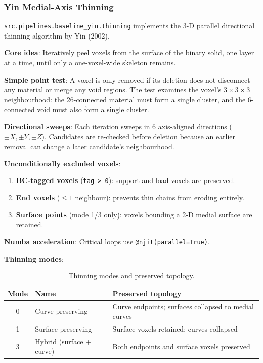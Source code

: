 \documentclass[a4paper, 11pt, openany]{report}
\begin{document}
\subsubsection{Yin Medial-Axis Thinning}

\texttt{src.pipelines.baseline\_yin.thinning} implements the 3-D parallel
directional thinning algorithm by Yin (2002).

\textbf{Core idea}: Iteratively peel voxels from the surface of the binary
solid, one layer at a time, until only a one-voxel-wide skeleton remains.

\textbf{Simple point test}: A voxel is only removed if its deletion does not
disconnect any material or merge any void regions.  The test examines the
voxel's $3 \times 3 \times 3$ neighbourhood: the 26-connected material must
form a single cluster, and the 6-connected void must also form a single cluster.

\textbf{Directional sweeps}: Each iteration sweeps in 6 axis-aligned directions
($\pm X, \pm Y, \pm Z$).  Candidates are re-checked before deletion because
an earlier removal can change a later candidate's neighbourhood.

\textbf{Unconditionally excluded voxels}:
\begin{enumerate}[nosep]
    \item \textbf{BC-tagged voxels} (\texttt{tag > 0}): support and load voxels
          are preserved.
    \item \textbf{End voxels} ($\le 1$ neighbour): prevents thin chains from
          eroding entirely.
    \item \textbf{Surface points} (mode 1/3 only): voxels bounding a 2-D medial
          surface are retained.
\end{enumerate}

\textbf{Numba acceleration}: Critical loops use \texttt{@njit(parallel=True)}.

\textbf{Thinning modes}:

\begin{table}[htbp]
\caption{Thinning modes and preserved topology.}
\label{tab:thinning-modes}
\centering
\begin{tabularx}{\textwidth}{clX}
\toprule
Mode & Name & Preserved topology \\
\midrule
0 & Curve-preserving & Curve endpoints; surfaces collapsed to medial curves \\
1 & Surface-preserving & Surface voxels retained; curves collapsed \\
3 & Hybrid (surface + curve) & Both endpoints and surface voxels preserved \\
\bottomrule
\end{tabularx}
\end{table}
\end{document}
